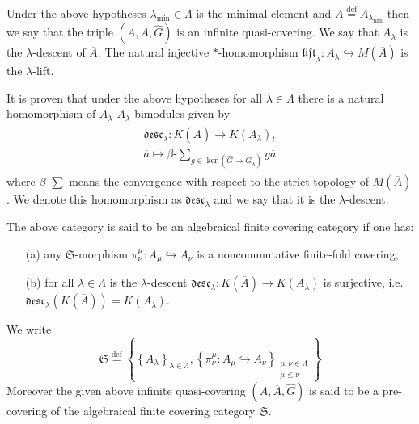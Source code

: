 \documentclass{beamer}
\theoremstyle{plain}
\newcommand{\be}{\begin{equation}}
\newcommand{\ee}{\end{equation}}
\newcommand{\desc}{\mathfrak{desc}}
\newcommand{\lift}{\mathfrak{lift}}
\newcommand{\la}{\lambda}
\newcommand{\La}{\Lambda}
\newcommand{\bt}{\beta}           %
\newcommand{\bean}{\begin{eqnarray*}}
\newcommand{\eean}{\end{eqnarray*}}
\newcommand{\bydef}{\stackrel{\mathrm{def}}{=}}
\newcommand{\hookto}{\hookrightarrow}        %
\begin{document}
\begin{frame}
 \begin{definition}\label{infinite_quasicovering_defn} 	Under the above hypotheses    $\la_{\mathrm{min}}\in \La$ is the minimal element and $A\bydef A_{\la_{\min}}$ then we say that the triple $\left( A, \overline A, \widehat G\right)$ is an  \alert{infinite quasi-covering}. We say that $A_\la$ is the $\la$-\alert{descent of} $\overline A$. The natural injective $*$-homomorphism $\lift_\la: A_\la \hookto M\left(\overline A \right)$ is the $\la$-\alert{lift}.
\end{definition}
\begin{definition}\label{infinite_desc_defn}
It is proven that under the above  hypotheses   for all $\la\in\La$ there is a  natural   homomorphism of $A_\la$-$A_\la$-bimodules given by
	\bean
	\begin{split}
		\desc_{\la} : K\left(\overline A \right) \to K\left(A_\la \right),\\
		\overline a \mapsto\bt\text{-} \sum_{	g \in \ker\left( \widehat{G}\to G_\la\right) }g \overline a
	\end{split}
	\eean
	where  $\bt\text{-} \sum$ means the convergence with respect to the strict topology of $M\left(\overline A\right)$. 
	We denote this homomorphism as   $\desc_{\la}$ and we say that it is  the $\la$-\alert{descent}.%
\end{definition}

\end{frame}


\begin{frame}
 
\begin{definition}
	The  above category is said to be an \alert{algebraical finite covering category} if one has:
	\begin{enumerate}
		\item [(a)] 
		any $\mathfrak{S}$-morphism $\pi^\mu_\nu : A_\mu \hookto A_\nu$ is a noncommutative finite-fold  covering,
		\item[(b)] for all $\la \in \La$ is the $\la$-{descent} $\desc_{\la} : K\left(\overline A \right) \to K\left(A_\la \right)$   is surjective, i.e. $\desc_{\la} \left(  K\left(\overline A \right)\right) = K\left(A_\la \right)$.%
	\end{enumerate}
	We write
	\be\label{algebraical_finite_covering_category_eqn}
	\mathfrak{S}\bydef \left\{\left\{A_\la\right\}_{\la\in \La}, \left\{\pi^\mu_\nu : A_\mu \hookto A_\nu\right\}_{\substack{\mu, \nu \in \La\\\mu \le \nu}}\right\}
	\ee
	Moreover the given above infinite quasi-covering $\left( A, \overline A, \widehat G\right)$ is said to be a \alert{pre-covering of the algebraical finite covering category}  $\mathfrak{S}$.
\end{definition}


\end{frame}
\end{document}
